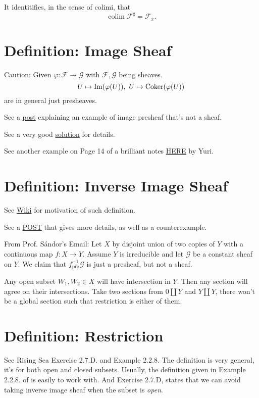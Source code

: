 It identitifies, in the sense of colimi, that
\[\operatorname{colim}\mathscr F^{\sharp}=\mathscr F_x.\]
  
\section{Definition: Image Sheaf}

Caution: Given $\varphi:\mathscr F\to\mathscr G$ with $\mathscr F,\mathscr G$ being sheaves.
\[U\mapsto \operatorname{Im} (\varphi(U)),~ U\mapsto \operatorname{Coker}(\varphi(U))\] are in general just presheaves.

See a \href{https://math.stackexchange.com/questions/3838804/image-presheaf-which-is-not-a-sheaf}{post} explaining an example of image presheaf that's not a sheaf.

See a very good \href{https://www2.math.ethz.ch/education/bachelor/lectures/fs2016/math/alg_geom/Solution12.pdf}{solution} for details.

See another example on Page 14 of a brilliant notes \href{https://pi.math.cornell.edu/~apatotski/7400-notes.pdf}{HERE} by Yuri.

\section{Definition: Inverse Image Sheaf}

See \href{https://en.wikipedia.org/wiki/Inverse_image_functor}{Wiki} for motivation of such definition.

See a \href{https://en.wikipedia.org/wiki/Inverse_image_functor}{POST} that gives more details, as well as a counterexample.

From Prof. S\'andor's Email: Let $X$ by disjoint union of two copies of $Y$ with a continuous map $f:X\to Y$. Assume $Y$ is irreducible and let $\mathscr G$ be a constant sheaf on $Y$. We claim that $f^{-1}_{\text{pre}} \mathscr G$ is just a presheaf, but not a sheaf. 

Any open subset $W_1, W_2\in X$ will have intersection in $Y$. Then any section will agree on their intersections. Take two sections from $0\amalg Y$ and $Y\amalg Y$, there won't be a global section such that restriction is either of them.

\section{Definition: Restriction}

See Rising Sea \cite{RaviRisingSea} Exercise 2.7.D.  and Example 2.2.8. The definition is very general, it's for both open and closed subsets. Usually, the definition given in Example 2.2.8. of \cite{RaviRisingSea} is easily to work with. And Exercise 2.7.D, states that we can avoid taking inverse image sheaf when the subset is \textit{open}.

